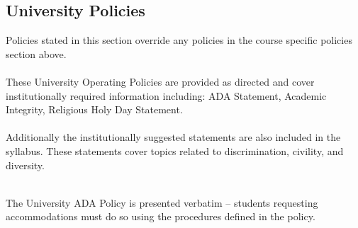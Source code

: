\documentclass[12pt]{article}
\begin{document}
\begin{thebibliography}{}
\section*{University Policies}
Policies stated in this section override any policies in the course specific policies section above.
~\\~\\
These University Operating Policies are provided as directed and cover institutionally required information including: 
ADA Statement, Academic Integrity, Religious Holy Day Statement.
\\~\\
Additionally the institutionally suggested statements are also included in the syllabus.  
These statements cover topics related to discrimination, civility, and diversity.  

~\\The University ADA Policy is presented verbatim -- students requesting accommodations must do so using the procedures defined in the policy.




\end{thebibliography}
\end{document}
